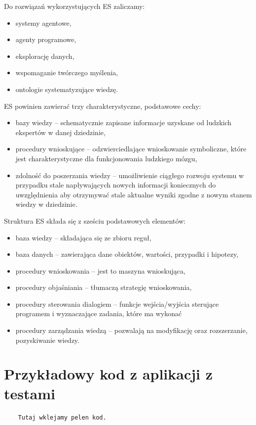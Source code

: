 \documentclass[12pt,a4paper]{article}
\begin{document}
	Do rozwiązań wykorzystujących ES zaliczamy:
	\begin{itemize}
		\item systemy agentowe,
		\item agenty programowe,
		\item eksplorację danych,
		\item wspomaganie twórczego myślenia,
		\item ontologie systematyzujące wiedzę.
	\end{itemize}
	\bigskip
	
	ES powinien zawierać trzy charakterystyczne, podstawowe cechy:
	\begin{itemize}
		\item bazy wiedzy -- schematycznie zapisane informacje uzyskane od ludzkich ekspertów w danej dziedzinie,
		\item procedury wnioskujące -- odzwierciedlające wnioskowanie symboliczne, które jest charakterystyczne dla funkcjonowania ludzkiego mózgu,
		\item zdolność do poszerzania wiedzy -- umożliwienie ciągłego rozwoju systemu w przypadku stale napływających nowych informacji koniecznych do uwzględnienia aby otrzymywać stale aktualne wyniki zgodne z nowym stanem wiedzy w dziedzinie.
	\end{itemize}
	\bigskip
	
	Struktura ES składa się z sześciu podstawowych elementów:
	\begin{itemize}
		\item baza wiedzy -- składająca się ze zbioru reguł,
		\item baza danych -- zawierająca dane obiektów, wartości, przypadki i hipotezy,
		\item procedury wnioskowania -- jest to maszyna wnioskująca,
		\item procedury objaśniania -- tłumaczą strategię wnioskowania,
		\item procedury sterowania dialogiem -- funkcje wejścia/wyjścia sterujące programem i wyznaczające zadania, które ma wykonać
		\item procedury zarządzania wiedzą -- pozwalają na modyfikację oraz rozszerzanie, pozyskiwanie wiedzy.
	\end{itemize}
	
	
	
	
	
	
	

\section*{Przykładowy kod z aplikacji z testami}


\begin{lstlisting}
	Tutaj wklejamy pelen kod. 
\end{lstlisting}
\end{document}
